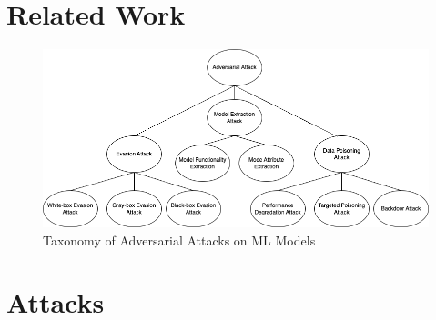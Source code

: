 \documentclass[conference]{IEEEtran}
\begin{document}





\section{Related Work}



\begin{figure}[t]
    \centering
    \includegraphics[width=\textwidth]{taxonomy2.png}
    \caption{Taxonomy of Adversarial Attacks on ML Models}
    \label{fig:taxonomy}
\end{figure}

\section{Attacks}
\end{document}
